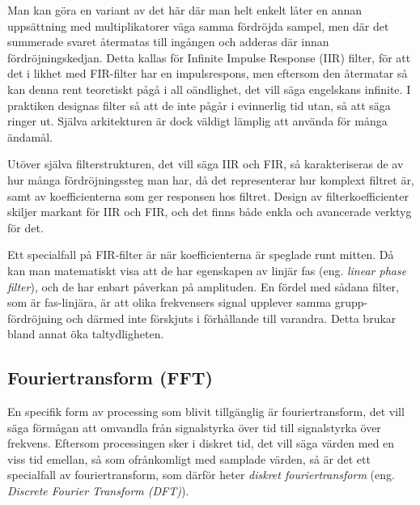 Man kan göra en variant av det här där man helt enkelt låter en annan
uppsättning med multiplikatorer väga samma fördröjda sampel, men där det
summerade svaret återmatas till ingången och adderas där innan
fördröjningskedjan.
Detta kallas för Infinite Impulse Response (IIR) filter, för att det i likhet
med FIR-filter har en impulsrespons, men eftersom den återmatar så kan denna
rent teoretiskt pågå i all oändlighet, det vill säga engelskans infinite.
I praktiken designas filter så att de inte pågår i evinnerlig tid utan, så att
säga ringer ut.
Själva arkitekturen är dock väldigt lämplig att använda för många ändamål.

Utöver själva filterstrukturen, det vill säga IIR och FIR, så karakteriseras de
av hur många fördröjningssteg man har, då det representerar hur komplext
filtret är, samt av koefficienterna som ger responsen hos filtret.
Design av filterkoefficienter skiljer markant för IIR och FIR, och det finns
både enkla och avancerade verktyg för det.

Ett specialfall på FIR-filter är när koefficienterna är speglade runt mitten.
Då kan man matematiskt visa att de har egenskapen av linjär fas (eng.
\emph{linear phase filter}), och de har enbart påverkan på amplituden.
En fördel med sådana filter, som är fas-linjära, är att olika frekvensers
signal upplever samma grupp-fördröjning och därmed inte förskjuts i förhållande
till varandra.
Detta brukar bland annat öka taltydligheten.

\subsection{Fouriertransform (FFT)}

En specifik form av processing som blivit tillgänglig är fouriertransform,
det vill säga förmågan att omvandla från signalstyrka över tid till
signalstyrka över frekvens.
Eftersom processingen sker i diskret tid, det vill säga värden med en viss tid
emellan, så som ofrånkomligt med samplade värden, så är det ett specialfall av
fouriertransform, som därför heter \emph{diskret fouriertransform} (eng.
\emph{Discrete Fourier Transform (DFT)}).

